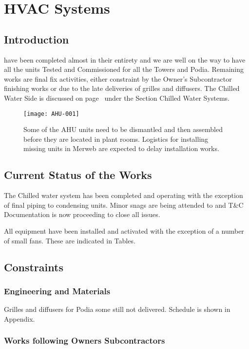 \chapter{HVAC Systems}
\section{Introduction}
\label{HVAC}

 have been completed almost in their entirety and we are well
on the way to have all the units Tested and Commissioned for all the Towers and Podia. Remaining
works are final fix activities, either constraint by the Owner's Subcontractor finishing works or
due to the late deliveries of grilles and diffusers. The Chilled
Water Side is discussed on page~\pageref{chilledwater} under the Section Chilled Water Systems.

\begin{figure*}%
  \texttt{[image: AHU-001]}
  \caption{Some of the AHU units need to be dismantled and then assembled before they are located in plant rooms. Logistics for installing missing units in Merweb are expected to delay installation works.}
  \label{fig:marginfig1}
\end{figure*}

\section{Current Status of the Works}

The Chilled water system has been completed and operating with the exception of final piping to
condensing units. Minor snags are being attended to and T\&C Documentation is now proceeding  to close all issues.

All equipment have been installed and activated with the exception of a number of small fans. These are indicated in Tables.

\section{Constraints}
\subsection{Engineering and Materials}

Grilles and diffusers for Podia some still not delivered. Schedule is shown in Appendix.

\subsection{Works following Owners Subcontractors}

